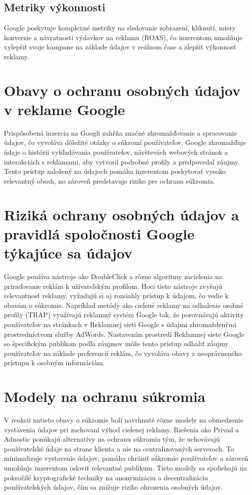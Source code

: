 \documentclass[10pt,slovak,a4paper]{article}
\begin{document}
\subsection{Metriky výkonnosti}
Google poskytuje komplexné metriky na sledovanie zobrazení, kliknutí, miery konverzie a návratnosti výdavkov na reklamu
 (ROAS), čo inzerentom umožňuje vylepšiť svoje kampane na základe údajov v reálnom čase a zlepšiť výkonnosť reklamy.

\section{Obavy o ochranu osobných údajov v reklame Google}
Prispôsobená inzercia na Googli zahŕňa značné zhromažďovanie a spracovanie údajov, čo vyvoláva dôležité otázky o 
súkromí používateľov. Google zhromažďuje údaje o histórii vyhľadávania používateľov, návštevách webových stránok a 
interakciách s reklamami, aby vytvoril podrobné profily a predpovedal záujmy. Tento prístup založený na údajoch pomáha 
inzerentom poskytovať vysoko relevantný obsah, no zároveň predstavuje riziko pre ochranu súkromia.\cite{7368607}

\section{Riziká ochrany osobných údajov a pravidlá spoločnosti Google týkajúce sa údajov}
Google používa nástroje ako DoubleClick a rôzne algoritmy zacielenia na priraďovanie reklám k užívateľským profilom. 
Hoci tieto nástroje zvyšujú relevantnosť reklamy, vyžadujú si aj rozsiahly prístup k údajom, čo vedie k obavám o 
súkromie. Napríklad metódy ako cielené reklamy na odhalenie osobné profily (TRAP) využívajú reklamný systém Google 
tak, že porovnávajú aktivity používateľov na stránkach v Reklamnej sieti Google s údajmi zhromaždenými prostredníctvom 
služby AdWords. Nastavením prostredí Reklamnej siete Google so špecifickým publikom podľa záujmov môže tento prístup 
odhaliť záujmy používateľov na základe preferencií reklám, čo vyvoláva obavy z neoprávneného prístupu k osobným 
informáciám.\cite{8526633}\cite{7737411}
\section{Modely na ochranu súkromia}
V reakcii natieto obavy o súkromie boli navrhnuté rôzne modely na obmedzenie vystavenia údajov pri zachovaní výhod 
cielenej reklamy. Riešenia ako Privad a Adnostic ponúkajú alternatívy na ochranu súkromia tým, že uchovávajú 
používateľské údaje na strane klienta a nie na centralizovaných serveroch. To minimalizuje vystavenie údajov, 
pomáha chrániť súkromie používateľov a zároveň umožňuje inzerentom osloviť relevantné publikum. Tieto modely sa 
spoliehajú na pokročilé kryptografické techniky na anonymizáciu a decentralizáciu používateľských údajov, čím sa 
znižuje riziko ohrozenia osobných údajov.
\end{document}
